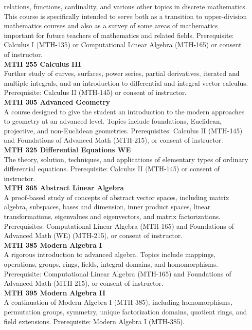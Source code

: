 \documentclass[
  letterpaper,
]{scrbook}
\begin{document}
relations, functions, cardinality, and various other topics in discrete
mathematics. This course is specifically intended to serve both as a
transition to upper-division mathematics courses and also as a survey of
some areas of mathematics important for future teachers of mathematics
and related fields. Prerequisite: Calculus I (MTH-135) or Computational
Linear Algebra (MTH-165) or consent of instructor.\\
\textbf{MTH 255 Calculus III}\\
Further study of curves, surfaces, power series, partial derivatives,
iterated and multiple integrals, and an introduction to differential and
integral vector calculus. Prerequisite: Calculus II (MTH-145) or consent
of instructor.\\
\textbf{MTH 305 Advanced Geometry}\\
A course designed to give the student an introduction to the modern
approaches to geometry at an advanced level. Topics include foundations,
Euclidean, projective, and non-Euclidean geometries. Prerequisites:
Calculus II (MTH-145) and Foundations of Advanced Math (MTH-215), or
consent of instructor.\\
\textbf{MTH 325 Differential Equations WE}\\
The theory, solution, techniques, and applications of elementary types
of ordinary differential equations. Prerequisite: Calculus II (MTH-145)
or consent of instructor.\\
\textbf{MTH 365 Abstract Linear Algebra}\\
A proof-based study of concepts of abstract vector spaces, including
matrix algebra, subspaces, bases and dimension, inner product spaces,
linear transformations, eigenvalues and eigenvectors, and matrix
factorizations. Prerequisites: Computational Linear Algebra (MTH-165)
and Foundations of Advanced Math (WE) (MTH-215), or consent of
instructor.\\
\textbf{MTH 385 Modern Algebra I}\\
A rigorous introduction to advanced algebra. Topics include mappings,
operations, groups, rings, fields, integral domains, and homomorphisms.
Prerequisite: Computational Linear Algebra (MTH-165) and Foundations of
Advanced Math (MTH-215), or consent of instructor.\\
\textbf{MTH 395 Modern Algebra II}\\
A continuation of Modern Algebra I (MTH 385), including homomorphisms,
permutation groups, symmetry, unique factorization domains, quotient
rings, and field extensions. Prerequisite: Modern Algebra I (MTH-385).
\end{document}
